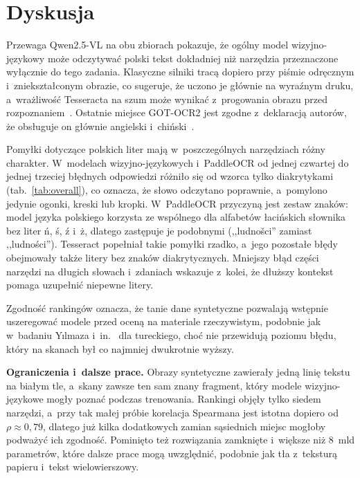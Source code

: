 \documentclass[runningheads,orivec]{llncs}
\begin{document}
\section{Dyskusja}

Przewaga \mbox{Qwen2.5-VL} na obu zbiorach pokazuje, że ogólny model wizyjno-językowy może odczytywać polski tekst
dokładniej niż narzędzia przeznaczone wyłącznie do tego zadania. Klasyczne silniki tracą dopiero przy piśmie
odręcznym i~zniekształconym obrazie, co sugeruje, że uczono je głównie na wyraźnym druku, a~wrażliwość
Tesseracta na szum może wynikać z~progowania obrazu przed rozpoznaniem~\cite{smith2007}. Ostatnie miejsce
\mbox{GOT-OCR2} jest zgodne z~deklaracją autorów, że obsługuje on głównie angielski i~chiński~\cite{wei2024got}.

Pomyłki dotyczące polskich liter mają w~poszczególnych narzędziach różny charakter. W~modelach wizyjno-językowych i~PaddleOCR od jednej
czwartej do jednej trzeciej błędnych odpowiedzi różniło się od wzorca tylko diakrytykami (tab.~\ref{tab:overall}),
co oznacza, że słowo odczytano poprawnie, a~pomylono jedynie ogonki, kreski lub kropki. W~PaddleOCR
przyczyną jest zestaw znaków: model języka polskiego korzysta ze wspólnego dla alfabetów łacińskich słownika bez
liter ń, ś, ź i~ż, dlatego zastępuje je podobnymi (,,ludnošci'' zamiast ,,ludności''). Tesseract popełniał
takie pomyłki rzadko, a~jego pozostałe błędy obejmowały także litery bez znaków diakrytycznych.
Mniejszy błąd części narzędzi na długich słowach i~zdaniach wskazuje z~kolei, że dłuższy kontekst pomaga
uzupełnić niepewne litery.

Zgodność rankingów oznacza, że tanie dane syntetyczne pozwalają wstępnie uszeregować modele przed oceną na
materiale rzeczywistym, podobnie jak w~badaniu Yılmaza i~in.~\cite{yilmaz2026} dla tureckiego, choć nie
przewidują poziomu błędu, który na skanach był co najmniej dwukrotnie wyższy.

\textbf{Ograniczenia i~dalsze prace.} Obrazy syntetyczne zawierały jedną linię tekstu na białym tle, a~skany
zawsze ten sam znany fragment, który modele wizyjno-językowe mogły poznać podczas trenowania. Rankingi objęły
tylko siedem narzędzi, a~przy tak małej próbie korelacja Spearmana jest istotna dopiero od $\rho\approx0{,}79$,
dlatego już kilka dodatkowych zamian sąsiednich miejsc mogłoby podważyć ich zgodność. Pominięto też rozwiązania
zamknięte i~większe niż 8~mld parametrów, które dalsze prace mogą uwzględnić, podobnie jak tła z~teksturą papieru
i~tekst wielowierszowy.
\end{document}

